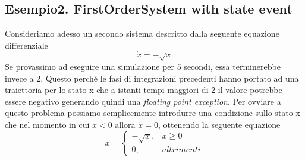 \subsection*{Esempio2. FirstOrderSystem with state event}
Consideriamo adesso un secondo sistema descritto dalla seguente equazione differenziale
\begin{equation}
    \dot{x} = -\sqrt{x}
\end{equation}
Se provassimo ad eseguire una simulazione per 5 secondi, essa terminerebbe invece a 2. Questo perché le fasi di integrazioni precedenti hanno portato ad una traiettoria per lo stato x che a istanti tempi maggiori di 2 il valore potrebbe essere negativo generando quindi una \textit{floating point exception}. Per ovviare a questo problema possiamo semplicemente introdurre una condizione sullo stato x che nel momento in cui $x < 0$ allora $\dot{x} = 0$, ottenendo la seguente equazione
\begin{equation}
    \dot{x} = \begin{cases}
        -\sqrt{x}, & x \geq 0\\
        0, & altrimenti
    \end{cases}
\end{equation}
